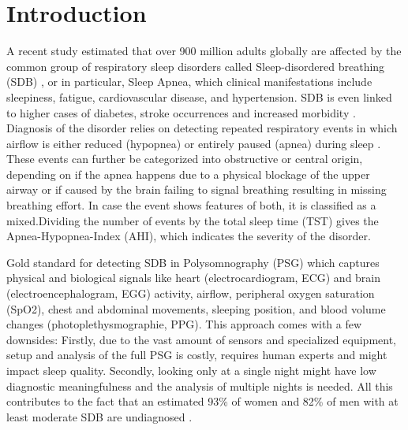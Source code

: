 \chapter{Introduction \label{Chapter-Intro}}

A recent study estimated that over 900 million adults globally are affected by the common group of respiratory sleep disorders called Sleep-disordered breathing (SDB) \cite{benjafield2019estimation}, or in particular, Sleep Apnea, which clinical manifestations include sleepiness, fatigue, cardiovascular disease, and hypertension. SDB is even linked to higher cases of diabetes, stroke occurrences and increased morbidity \cite{dempsey2010dempsey,patil2007adult,young2002epidemiology}.
Diagnosis of the disorder relies on detecting repeated respiratory events in which airflow is either reduced (hypopnea) or entirely paused (apnea) during sleep \cite{gould2012sleep,dempsey2010dempsey}. These events can further be categorized into obstructive or central origin, depending on if the apnea happens due to a physical blockage of the upper airway or if caused by the brain failing to signal breathing resulting in missing breathing effort. In case the event shows features of both, it is classified as a mixed.Dividing the number of events by the total sleep time (TST) gives the Apnea-Hypopnea-Index (AHI), which indicates the severity of the disorder.

Gold standard for detecting SDB in Polysomnography (PSG) which captures physical and biological signals like heart (electrocardiogram, ECG) and brain (electroencephalogram, EGG) activity, airflow, peripheral oxygen saturation (SpO2), chest and abdominal movements, sleeping position, and blood volume changes (photoplethysmographie, PPG).
This approach comes with a few downsides: Firstly, due to the vast amount of sensors and specialized equipment, setup and analysis of the full PSG is costly, requires human experts and might impact sleep quality. Secondly, looking only at a single night might have low diagnostic meaningfulness \cite{toussaint1995first} and the analysis of multiple nights is needed. All this contributes to the fact that an estimated 93\% of women and 82\% of men with at least moderate SDB are undiagnosed \cite{young1997estimation}.

